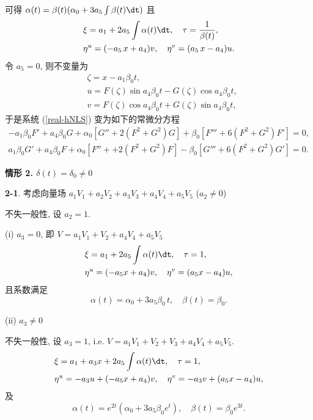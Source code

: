 可得 $\alpha(t)=\beta(t)(\alpha_0+3a_5\int\beta(t)\dt)$ 且
\begin{align*}
&\xi=a_1+2a_5\int\alpha(t)\dt,\quad \tau=\frac{1}{\beta(t)},\\
&\eta^u=(-a_5\,x+a_4)v,\quad \eta^v=(a_5\,x-a_4)u.
\end{align*}
令 $a_5=0$, 则不变量为
\begin{equation}
\begin{aligned}
&\zeta=x-a_1\beta_0 t,\\
&u=F(\zeta)\sin{a_4\beta_0t}-G(\zeta)\cos{a_4\beta_0t},\\
&v=F(\zeta)\cos{a_4\beta_0t}+G(\zeta)\sin{a_4\beta_0t},
\end{aligned}
\end{equation}
于是系统 (\ref{real-hNLS}) 变为如下的常微分方程
\begin{equation}
\begin{aligned}
-a_1\beta_0F'+a_4\beta_0G+\alpha_0[G''+2(F^2+G^2)G]+\beta_0[F'''+6(F^2+G^2)F']=0,\\
a_1\beta_0G'+a_4\beta_0F+\alpha_0[F''++2(F^2+G^2)F]-\beta_0[G'''+6(F^2+G^2)G']=0.
\end{aligned}
\end{equation}


\noindent \textbf{情形 2. $\delta(t)=\delta_0\neq0$}

\textbf{2-1}. 考虑向量场 $a_1 V_1+a_2 V_2+a_3 V_3+a_4 V_4+a_5 V_5$ ($a_2\neq 0$)

不失一般性, 设 $a_2=1$.

(i) $a_3=0$, 即 $V=a_1 V_1+ V_2+a_4 V_4+a_5 V_5$
\begin{align*}
&\xi=a_1+2a_5\int\alpha(t)\dt,\quad \tau=1,\\
&\eta^u=(-a_5x+a_4)v,\quad \eta^v=(a_5x-a_4)u,
\end{align*}
且系数满足
\begin{equation*}
\alpha(t)=\alpha_0+3a_5\beta_0\,t,\quad \beta(t)=\beta_0.
\end{equation*}


(ii) $a_3\neq0$

不失一般性, 设 $a_3=1$, i.e. $V=a_1 V_1+ V_2+V_3+a_4 V_4+a_5 V_5$.
\begin{align*}
&\xi=a_1+a_3x+2a_5\int\alpha(t)\dt,\quad \tau=1,\\
&\eta^u=-a_3u+(-a_5x+a_4)v,\quad \eta^v=-a_3v+(a_5x-a_4)u,
\end{align*}
及
\begin{equation*}
\alpha(t)= e^{2t}(\alpha_0+3a_5\beta_0e^{t}),\quad \beta(t)=\beta_0e^{3t}.
\end{equation*}

